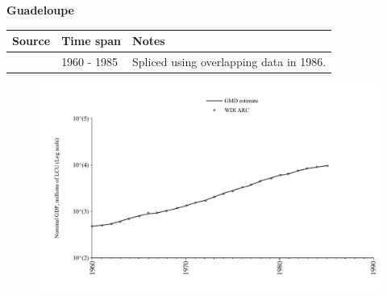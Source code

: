 \documentclass[12pt,a4paper,landscape]{article}
\begin{document}
\begin{adjustbox}{max totalsize={\paperwidth}{\paperheight},center}
\begin{minipage}[t][\textheight][t]{\textwidth}
\vspace*{0.5cm}
{}
\begin{center}
{\Large\bfseries Guadeloupe}
\end{center}
\vspace{0.5cm}
\begin{table}[H]
\centering
\small
\begin{tabular}{|l|l|l|}
\hline
\textbf{Source} & \textbf{Time span} & \textbf{Notes} \\
\hline
\rowcolor{white}\cite{WDI_ARC}& 1960 - 1985 &Spliced using overlapping data in 1986.\\
\hline
\end{tabular}
\end{table}
\begin{figure}[H]
\centering
\includegraphics[width=\textwidth,height=0.6\textheight,keepaspectratio]{graphs/GLP_nGDP.pdf}
\end{figure}
\end{minipage}
\end{adjustbox}
\end{document}

